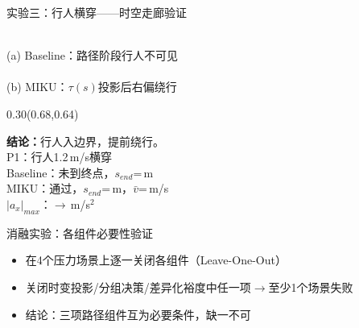 \documentclass[aspectratio=169,10pt,fontset=none]{ctexbeamer}
\begin{document}
\begin{frame}{实验三：行人横穿——时空走廊验证}
\vspace{-0.4em}

\begin{center}
  \resizebox{0.50\paperwidth}{!}{}\\[-3pt]
  {\footnotesize (a) Baseline：路径阶段行人不可见}\\[1pt]
  \resizebox{0.50\paperwidth}{!}{}\\[-3pt]
  {\footnotesize (b) MIKU：$\tau(s)$投影后右偏绕行}
\end{center}

\begin{textblock*}{0.30\paperwidth}(0.68\paperwidth,0.64\paperheight)
  \begin{tcolorbox}[slideMetricCard,title=关键指标]
    \scriptsize\raggedright
    \textbf{结论：}行人入边界，提前绕行。\\
    P1：行人1.2\,m/s横穿\\
    Baseline：未到终点，$s_{end}$=\MOneBaselineSEnd\,m\\
    MIKU：通过，$s_{end}$=\MOneMikuSEnd\,m，$\bar{v}$=\MOneMikuAvgV\,m/s\\
    $|a_x|_{max}$：\MOneBaselineMaxAbsA$\to$\MOneMikuMaxAbsA\,m/s$^2$
  \end{tcolorbox}
\end{textblock*}
\end{frame}

\begin{frame}{消融实验：各组件必要性验证}
\vspace{0.3em}
\small
\begin{itemize}\setlength\itemsep{2pt}
  \item 在4个压力场景上逐一关闭各组件（Leave-One-Out）
  \item 关闭时变投影/分组决策/差异化裕度中任一项$\to$至少1个场景失败
  \item 结论：三项路径组件互为必要条件，缺一不可
\end{itemize}
\end{frame}
\end{document}
